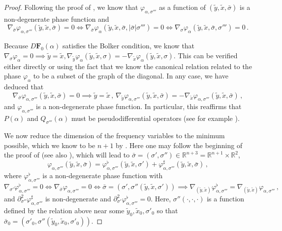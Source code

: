 \documentclass[11pt]{amsart}
\theoremstyle{definition}
\numberwithin{equation}{section}
\newcommand{\mR}{\mathbb{R}}                    %
\newcommand{\abs}[1]{\lvert #1 \rvert}          %
\begin{document}
\begin{proof}
	Following the proof of \cite[Lem.~7.1]{zbMATH03481135}, we know that $\varphi_{\alpha,\sigma'''}$ as a function of $(\tilde{y},\tilde{x},\bar \sigma)$ is a non-degenerate phase function and 
    \[
    \nabla_{\bar\sigma}\varphi_{\alpha,\sigma'''}(\tilde{y},\tilde{x},\bar\sigma) = 0\iff \nabla_{\bar\sigma} \varphi_\alpha(\tilde{y},\tilde{x},\bar\sigma,\abs{\bar\sigma}\sigma''') = 0 \iff \nabla_{\sigma}\varphi_\alpha(\tilde{y},\tilde{x},\bar\sigma,\sigma''') = 0\,.
    \]

    Because $D\mathbf{F}_0(\alpha)$ satisfies the Bolker condition, we know that $\nabla_{\sigma}\varphi_\alpha = 0 \implies \tilde{y}=\tilde{x}, \nabla_{\tilde{y}} \varphi_\alpha(\tilde{y},\tilde{x},\sigma)=-\nabla_{\tilde{x}}\varphi_\alpha(\tilde{y},\tilde{x},\sigma)$. This can be verified either directly or using the fact that we know the canonical relation related to the phase $\varphi_\alpha$ to be a subset of the graph of the diagonal. In any case, we have deduced that 
\begin{equation}\label{eq:samemanifold}
\nabla_{\bar\sigma}\varphi_{\alpha,\sigma'''}(\tilde{y},\tilde{x},\bar \sigma) = 0\implies \tilde{y}=\tilde{x}\,,\,\nabla_{\tilde{y}}\varphi_{\alpha,\sigma'''}(\tilde{y},\tilde{x},\bar \sigma) = -\nabla_{\tilde{x}}\varphi_{\alpha,\sigma'''}(\tilde{y},\tilde{x},\bar \sigma)\,,
\end{equation}
and $\varphi_{\alpha,\sigma'''}$ is a non-degenerate phase function. In particular, this reaffirms that $P(\alpha)$ and $Q_{\sigma'''}(\alpha)$ must be pseudodifferential operators (see for example \cite[\S~2.5]{zbMATH05817029}). 

We now reduce the dimension of the frequency variables to the minimum possible, which we know to be $n+1$ by \cite[Lem.~2.3.5]{zbMATH05817029}. %
Here one may follow the beginning of the proof of \cite[Thm.~2.3.4]{zbMATH05817029} (see also \cite[Prop.~18.4.6]{MR4436039}), which will lead to $ \bar\sigma = (\sigma',\sigma'')\in \mR^{n+3} = \mR^{n+1}\times\mR^{2}$,
\begin{equation}\label{eq:decomp}
		\varphi_{\alpha,\sigma'''}(\tilde{y},\tilde{x},\bar\sigma) = \varphi_{\alpha,\sigma'''}^\flat(\tilde{y},\tilde{x},\sigma') + \varphi_{\alpha,\sigma'''}^\sharp(\tilde{y},\tilde{x},\bar\sigma)\,,
\end{equation}
	where $\varphi_{\alpha,\sigma'''}^\flat$ is a non-degenerate phase function with
	\[
		\nabla_{\sigma'} \varphi_{\alpha,\sigma'''}^\flat=0\iff \nabla_{\bar\sigma} \varphi_{\alpha,\sigma'''} = 0 \iff \bar\sigma = (\sigma',\sigma''(\tilde{y},\tilde{x},\sigma'))\implies \nabla_{(\tilde{y},\tilde{x})} \varphi_{\alpha,\sigma'''}^\flat = \nabla_{(\tilde{y},\tilde{x})} \varphi_{\alpha,\sigma'''}\,,
	\]
	and $\partial_{\sigma''}^2 \varphi_{\alpha,\sigma'''}^\sharp$ is non-degenerate and $\partial_{\sigma'}^2\varphi_{\alpha,\sigma'''}^\flat = 0$. Here, $\sigma''(\cdot,\cdot,\cdot)$ is a function defined by the relation above near some $\tilde{y}_0,\tilde{x}_0,\sigma'_0$ so that $\bar\sigma_0 = (\sigma'_0,\sigma''(\tilde{y}_0,\tilde{x}_0,\sigma'_0))$.


\end{proof}
\end{document}
